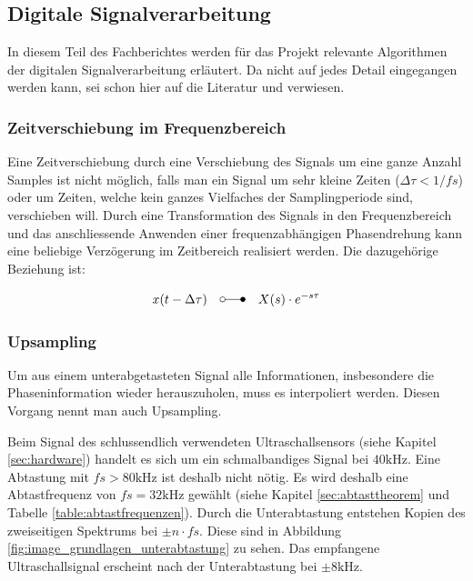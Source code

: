 \clearpage
\subsection{Digitale Signalverarbeitung}\label{sec:digitale_signalverarbeitung}
In diesem Teil des Fachberichtes werden für das Projekt relevante Algorithmen der digitalen Signalverarbeitung erläutert. Da nicht auf jedes Detail eingegangen werden kann, sei schon hier auf die Literatur \cite{RENNERT} und \cite{MEYER} verwiesen.

\subsubsection{Zeitverschiebung im Frequenzbereich}\label{sec:zeitverschiebung_im_frequenzbereich}
Eine Zeitverschiebung durch eine Verschiebung des Signals um eine ganze Anzahl Samples ist nicht möglich, falls man ein Signal um sehr kleine Zeiten ($\Delta \tau < 1/fs$) oder um Zeiten, welche kein ganzes Vielfaches der Samplingperiode sind, verschieben will. Durch eine Transformation des Signals in den Frequenzbereich und das anschliessende Anwenden einer frequenzabhängigen Phasendrehung kann eine beliebige Verzögerung im Zeitbereich realisiert werden. Die dazugehörige Beziehung ist:

\begin{equation}
x (t-\Delta \tau) \quad \laplace \quad X(s)\cdot e^{-s\tau}
\label{eq:zeitverschiebung_phasendrehung}
\end{equation}

\subsubsection{Upsampling}\label{sec:upsampling}
Um aus einem unterabgetasteten Signal alle Informationen, insbesondere die Phaseninformation wieder herauszuholen, muss es interpoliert werden. Diesen Vorgang nennt man auch Upsampling.

Beim Signal des schlussendlich verwendeten Ultraschallsensors (siehe Kapitel \ref{sec:hardware}) handelt es sich um ein schmalbandiges Signal bei $40 \mathrm{kHz}$. Eine Abtastung mit $fs > 80 \mathrm{kHz}$ ist deshalb nicht nötig. Es wird deshalb eine Abtastfrequenz von $fs = 32 \mathrm{kHz}$ gewählt (siehe Kapitel \ref{sec:abtasttheorem} und Tabelle \ref{table:abtastfrequenzen}). Durch die Unterabtastung entstehen Kopien des zweiseitigen Spektrums bei $ \pm n \cdot fs$. Diese sind in Abbildung \ref{fig:image_grundlagen_unterabtastung} zu sehen. Das empfangene Ultraschallsignal erscheint nach der Unterabtastung bei $\pm 8 \mathrm{kHz}$.

